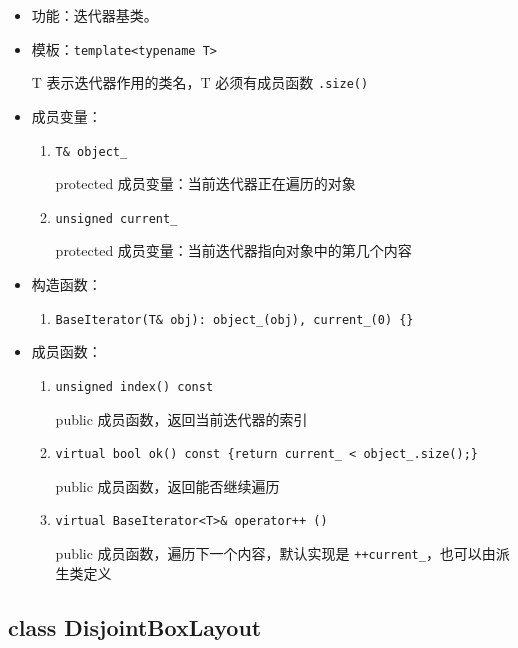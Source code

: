 \documentclass[cn, bibend=bibtex]{elegantpaper}
\theoremstyle{plain}
\begin{document}
\begin{itemize}
  \item 功能：迭代器基类。
  \item 模板：\lstinline|template<typename T>|

  T 表示迭代器作用的类名，T 必须有成员函数 \verb|.size()|
  \item 成员变量：
  \begin{enumerate}
    \item \lstinline|T& object_|

    protected 成员变量：当前迭代器正在遍历的对象
  
    \item \lstinline|unsigned current_|
    
    protected 成员变量：当前迭代器指向对象中的第几个内容
  \end{enumerate}
  \item 构造函数：
  \begin{enumerate}
    \item \lstinline|BaseIterator(T& obj): object_(obj), current_(0) {}|
  \end{enumerate}
  \item 成员函数：
  \begin{enumerate}
    \item \lstinline|unsigned index() const|

    public 成员函数，返回当前迭代器的索引

    \item \lstinline|virtual bool ok() const {return current_ < object_.size();}|

    public 成员函数，返回能否继续遍历

    \item \lstinline|virtual BaseIterator<T>& operator++ ()|

    public 成员函数，遍历下一个内容，默认实现是 \verb|++current_|，也可以由派生类定义
  \end{enumerate}
\end{itemize}

\subsection{class DisjointBoxLayout}
\end{document}
